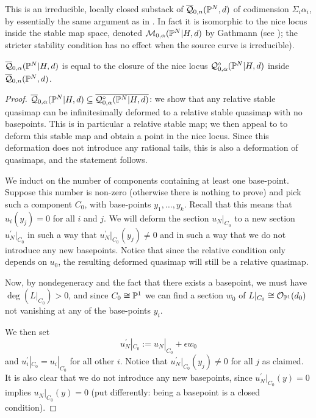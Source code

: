 This is an irreducible, locally closed substack of $\overline{\mathcal Q}_{0,n}(\mathbb P^N,d)$ of codimension $\Sigma_i \alpha_i$, by essentially the same argument as in \cite[Lemma 1.8]{Ga}. In fact it is isomorphic to the nice locus inside the stable map space, denoted $\mathcal M_{0,\alpha}(\mathbb P^N|H,d)$ by Gathmann (see \cite[Def. 1.6]{Ga}); the stricter stability condition has no effect when the source curve is irreducible).

\begin{lem}
$\overline{\mathcal Q}_{0,\alpha}(\mathbb P^N|H,d)$ is equal to the closure of the nice locus $\mathcal{Q}^{\circ}_{0,\alpha}(\mathbb P^N|H,d)$ inside $\overline{\mathcal Q}_{0,n}(\mathbb P^N,d)$. 
\end{lem}
\begin{proof}
$\overline{\mathcal Q}_{0,\alpha}(\mathbb P^N|H,d)\subseteq\overline{\mathcal{Q}^{\circ}_{0,\alpha}(\mathbb P^N|H,d)}$: we show that any relative stable quasimap can be infinitesimally deformed to a relative stable quasimap with no basepoints. This is in particular a relative stable map; we then appeal to \cite[Prop. 1.14]{Ga} to deform this stable map and obtain a point in the nice locus. Since this deformation does not introduce any rational tails, this is also a deformation of quasimaps, and the statement follows.

We induct on the number of components containing at least one base-point. Suppose this number is non-zero (otherwise there is nothing to prove) and pick such a component $C_0$, with base-points $y_1 ,\ldots, y_k$. Recall that this means that $u_i(y_j)=0$ for all $i$ and $j$. We will deform the section $u_N|_{C_0}$ to a new section $u_N^\prime|_{C_0}$ in such a way that $u_N^\prime|_{C_0}(y_j) \neq 0$ and in such a way that we do not introduce any new basepoints. Notice that since the relative condition only depends on $u_0$, the resulting deformed quasimap will still be a relative quasimap.

Now, by nondegeneracy and the fact that there exists a basepoint, we must have $\deg(L|_{C_0})>0$, and since $C_0 \cong \mathbb P^1$ we can find a section $w_0$ of $L|_{C_0} \cong \mathcal{O}_{\mathbb P^1}(d_0)$ not vanishing at any of the base-points $y_i$.

We then set
\begin{equation*} u_N^\prime|_{C_0} := u_N|_{C_0} + \epsilon w_0 \end{equation*}
and $u_i^\prime|_{C_0} = u_i|_{C_0}$ for all other $i$. Notice that $u_N^\prime|_{C_0}(y_j) \neq 0$ for all $j$ as claimed. It is also clear that we do not introduce any new basepoints, since $u_N^\prime|_{C_0}(y) = 0$ implies $u_N|_{C_0}(y)=0$ (put differently: being a basepoint is a closed condition).


\end{proof}
